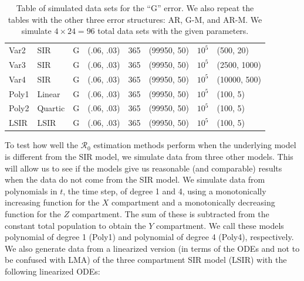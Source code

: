 \documentclass[12pt]{article}
\newcommand{\rr}{\ensuremath{\mathcal{R}_0}}
\begin{document}
\begin{table}[]
\begin{tabular}{@{}llllllll@{}}
  Var2      & SIR      &   G             & (.06, .03)                          &     365       &  (99950, 50)                    &  $10^5$          &(500, 20)                                \\
  Var3      & SIR      &   G             & (.06, .03)                          &     365       &  (99950, 50)                    &  $10^5$          &(2500, 1000)                                \\
  Var4      & SIR      &   G             & (.06, .03)                          &     365       &  (99950, 50)                    &  $10^5$          &(10000, 500)                                \\ \midrule
 Poly1     & Linear      &   G             & (.06, .03)                          &     365       &  (99950, 50)                    &  $10^5$          &(100, 5)                            \\
Poly2    & Quartic      &   G             & (.06, .03)                          &     365       &  (99950, 50)                    &  $10^5$          &(100, 5)                            \\ 
   LSIR     & LSIR      &   G             & (.06, .03)                          &     365       &  (99950, 50)                    &  $10^5$          &(100, 5)                            \\ 
  \bottomrule
\end{tabular}
\caption{Table of simulated data sets for the ``G'' error.  We also repeat the tables with the other three error structures: AR, G-M, and AR-M.  We simulate $4 \times 24=96$ total data sets with the given parameters.}
\label{tab:simulated-data}
\end{table}

To test how well the $\rr$ estimation methods perform when the underlying model is different from the SIR model, we simulate data from three other models. This will allow us to see if the models give us reasonable (and comparable) results when the data do not come from the SIR model. We simulate data from polynomials in $t$, the time step, of degree 1 and 4, using a monotonically increasing function for the $X$ compartment and a monotonically decreasing function for the $Z$ compartment.   The sum of these is subtracted from the constant total population to obtain the $Y$ compartment. We call these models polynomial of degree 1 (Poly1) and polynomial of degree 4 (Poly4), respectively. We also generate data from a linearized version (in terms of the ODEs and not to be confused with LMA) of the three compartment SIR model (LSIR) with the following linearized ODEs:
\end{document}
